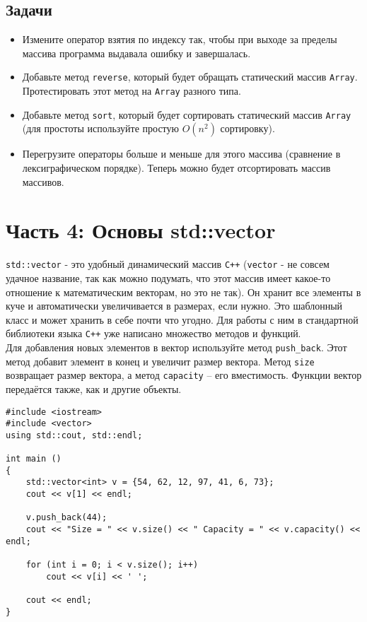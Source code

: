 \documentclass{article}
\begin{document}
\subsection*{Задачи}
\begin{itemize}
\item Измените оператор взятия по индексу так, чтобы при выходе за пределы массива программа выдавала ошибку и завершалась.
\item Добавьте метод \texttt{reverse}, который будет обращать статический массив \texttt{Array}. Протестировать этот метод на \texttt{Array} разного типа.
\item Добавьте метод \texttt{sort}, который будет сортировать статический массив \texttt{Array} (для простоты используйте простую $O(n^2)$ сортировку).
\item Перегрузите операторы больше и меньше для этого массива (сравнение в лексиграфическом порядке). Теперь можно будет отсортировать массив массивов.

\end{itemize}


\newpage
\section*{Часть 4: Основы std::vector}
\texttt{std::vector} - это удобный динамический массив \texttt{C++} (\texttt{vector} - не совсем удачное название, так как можно подумать, что этот массив имеет какое-то отношение к математическим векторам, но это не так). Он хранит все элементы в куче и автоматически увеличивается в размерах, если нужно. Это шаблонный класс и может хранить в себе почти что угодно. Для работы с ним в стандартной библиотеки языка \texttt{C++} уже написано множество методов и функций.\\

Для добавления новых элементов в вектор используйте метод \texttt{push\_back}. Этот метод добавит элемент в конец и увеличит размер вектора. Метод \texttt{size} возвращает размер вектора, а метод \texttt{capacity} -- его вместимость. Функции вектор передаётся также, как и другие объекты.
\begin{lstlisting}
#include <iostream>
#include <vector>
using std::cout, std::endl;

int main () 
{
    std::vector<int> v = {54, 62, 12, 97, 41, 6, 73};
    cout << v[1] << endl;
    
    v.push_back(44);
    cout << "Size = " << v.size() << " Capacity = " << v.capacity() << endl;
    
    for (int i = 0; i < v.size(); i++)
    	cout << v[i] << ' ';

    cout << endl;
}
\end{lstlisting}
\end{document}
